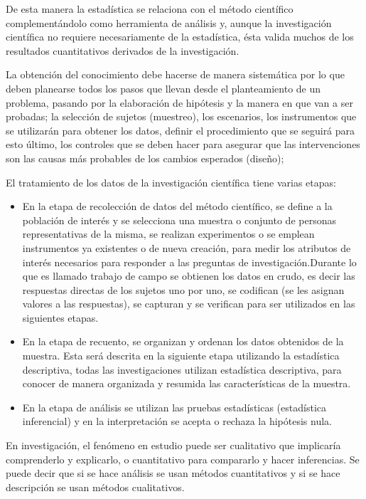 De esta manera la estad\'istica se relaciona con el m\'etodo cient\'ifico complement\'andolo como herramienta de an\'alisis y, aunque la investigaci\'on cient\'ifica no requiere necesariamente de la estad\'istica, \'esta valida muchos de los resultados cuantitativos derivados de la investigaci\'on. 

La obtenci\'on del conocimiento debe hacerse de manera sistem\'atica por lo que deben planearse todos los pasos que llevan desde el planteamiento de un problema, pasando por la elaboraci\'on de hip\'otesis y la manera en que van a ser probadas; la selecci\'on de sujetos (muestreo), los escenarios, los instrumentos que se utilizar\'an para obtener los datos, definir el procedimiento que se seguir\'a para esto \'ultimo, los controles que se deben hacer para asegurar que las intervenciones son las causas m\'as probables de los cambios esperados (dise\~no); 

El tratamiento de los datos de la investigaci\'on cient\'ifica tiene varias etapas:

\begin{itemize}
    \item En la etapa de recolecci\'on de datos del m\'etodo cient\'ifico, se define a la poblaci\'on de inter\'es y se selecciona una muestra o conjunto de personas representativas de la misma, se realizan experimentos o se emplean instrumentos ya existentes o de nueva creaci\'on, para medir los atributos de inter\'es necesarios para responder a las preguntas de investigaci\'on.Durante lo que es llamado trabajo de campo se obtienen los datos en crudo, es decir las respuestas directas de los sujetos uno por uno, se codifican (se les asignan valores a las respuestas), se capturan y se verifican para ser utilizados en las siguientes etapas.
    \item En la etapa de recuento, se organizan y ordenan los datos obtenidos de la muestra. Esta ser\'a descrita en la siguiente etapa utilizando la estad\'istica descriptiva, todas las investigaciones utilizan estad\'istica descriptiva, para conocer de manera organizada y resumida las caracter\'isticas de la muestra.
    \item En la etapa de an\'alisis se utilizan las pruebas estad\'isticas (estad\'istica inferencial) y en la interpretaci\'on se acepta o rechaza la hip\'otesis nula.
\end{itemize}

En investigaci\'on, el fen\'omeno en estudio puede ser cualitativo que implicar\'ia comprenderlo y explicarlo, o cuantitativo para compararlo y hacer inferencias. Se puede decir que si se hace an\'alisis se usan m\'etodos cuantitativos y si se hace descripci\'on se usan m\'etodos cualitativos. 

